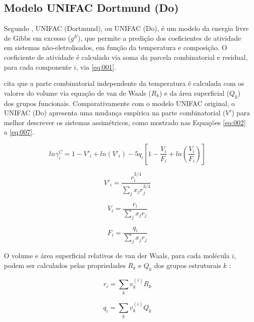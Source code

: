 \subsection{Modelo UNIFAC Dortmund (Do)}

Segundo , UNIFAC (Dortmund), ou
UNIFAC (Do), é um modelo da energia livre de Gibbs em 
excesso ($g^E$), que permite a predição dos coeficientes de atividade em
sistemas não-eletrolisados, em função da temperatura e 
composição. O coeficiente de atividade é calculado via 
soma da parcela combinatorial e residual, para cada 
componente $i$, via \autoref{eq:001}.

 cita que a parte combinatorial 
independente da temperatura é
calculada com os valores do volume via equação de van 
de Waals ($R_k$) e da área superficial ($Q_k$) dos grupos funcionais. 
Comparativamente com o modelo UNIFAC original, o UNIFAC (Do)
 apresenta uma mudança empírica na parte combinatorial ($V'$) 
para melhor descrever os sistemas assimétricos, como 
mostrado nas Equações \ref{eq:002} a \ref{eq:007}.

\begin{equation}\label{eq:002}
ln\gamma_i^C = 1 - V'_i + ln(V'_i) - 5q_i\left [ 1
- \frac{V_i}{F_i} + ln\left ( \frac{V_i}{F_i} \right ) \right ]
\end{equation}

\begin{equation}\label{eq:003}
V'_i = \frac{r_i^{3/4}}{\displaystyle\sum_jx_jr_j^{3/4}}
\end{equation}

\begin{equation}\label{eq:004}
V_i = \frac{r_i}{\displaystyle\sum_jx_jr_j}
\end{equation}

\begin{equation}\label{eq:005}
F_i = \frac{q_i}{\displaystyle\sum_jx_jr_j}
\end{equation}

O volume e área superficial relativos de van der Waals, para cada molécula $i$,
podem ser calculados pelas propriedades $R_k$  e $Q_k$  dos grupos estruturais
$k$ :

\begin{equation}\label{eq:006}
r_i = \displaystyle\sum_kv_k^{(i)}R_k
\end{equation}

\begin{equation}\label{eq:007}
q_i = \displaystyle\sum_kv_k^{(i)}Q_k
\end{equation}

